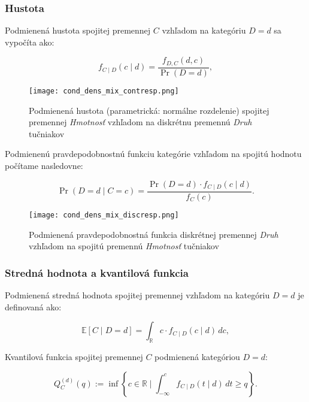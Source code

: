 \subsubsection{Hustota}

Podmienená hustota spojitej premennej $C$ vzhľadom na kategóriu $D=d$ sa vypočíta ako:

\begin{equation}
f_{C \mid D}(c \mid d) = \frac{f_{D,C}(d, c)}{\Pr(D = d)},
\end{equation}

\begin{figure}[H]
    \centering
    \texttt{[image: cond\_dens\_mix\_contresp.png]}
    \caption{Podmienená hustota (parametrická: normálne rozdelenie) spojitej premennej \textit{Hmotnosť} vzhľadom na diskrétnu premennú \textit{Druh} tučniakov}
    \label{fig:cond_dens_mix_contresp}
\end{figure}

Podmienenú pravdepodobnostnú funkciu kategórie vzhľadom na spojitú hodnotu počítame nasledovne:

\begin{equation}
\Pr(D = d \mid C = c) = \frac{\Pr(D = d) \cdot f_{C \mid D}(c \mid d)}{f_C(c)}.
\end{equation}

\begin{figure}[H]
    \centering
    \texttt{[image: cond\_dens\_mix\_discresp.png]}
    \caption{Podmienená pravdepodobnostná funkcia diskrétnej premennej \textit{Druh} vzhľadom na spojitú premennú \textit{Hmotnosť} tučniakov}
    \label{fig:cond_dens_mix_contresp}
\end{figure}

\subsubsection{Stredná hodnota a kvantilová funkcia}

Podmienená stredná hodnota spojitej premennej vzhľadom na kategóriu $D = d$ je definovaná ako:

\begin{equation}
\mathbb{E}[C \mid D = d] = \int_{\mathbb{R}} c \cdot f_{C \mid D}(c \mid d) \, dc,
\end{equation}

Kvantilová funkcia spojitej premennej $C$ podmienená kategóriou $D = d$:

\begin{equation}
Q_C^{(d)}(q) := \inf \left\{ c \in \mathbb{R} \mid \int_{-\infty}^c f_{C \mid D}(t \mid d) \, dt \geq q \right\}.
\end{equation}

